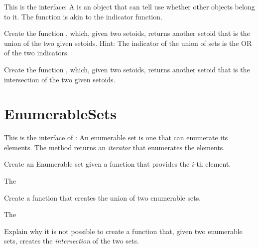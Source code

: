 This is the \Setoid interface:
%
%
A \Setoid is an object that can tell use whether other objects belong to it.
The  function is akin to the indicator function.


\begin{exercise}
Create the function , which, given two setoids, returns another setoid that is the union of the two given setoids.
%
%
Hint: The indicator of the union of sets is the OR of the two indicators.
\end{exercise}

\begin{exercise}
Create the function , which, given two setoids, returns another setoid that is the intersection of the two given setoids.
%
\end{exercise}


\section{EnumerableSets}

This is the interface of :
%
%
An enumerable set is one that can enumerate its elements.
The method  returns an \emph{iterator} that enumerates the elements.

\begin{exercise}
Create an Enumerable set given a function that provides the $i$-th element.

The
%
\end{exercise}

\begin{exercise}
Create a function that creates the union of two enumerable sets.

The
%
\end{exercise}

\begin{exercise}
Explain why it is not possible to create a function that, given two enumerable sets,
creates the \emph{intersection} of the two sets.
\end{exercise}


